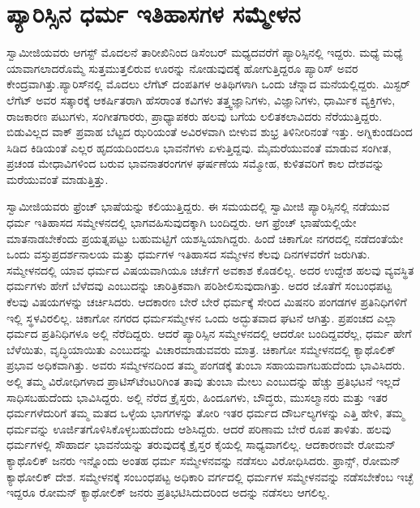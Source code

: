 
\chapter{ಪ್ಯಾರಿಸ್ಸಿನ ಧರ್ಮ ಇತಿಹಾಸಗಳ ಸಮ್ಮೇಳನ }

 ಸ್ವಾಮೀಜಿಯವರು ಆಗಸ್ಟ್ ಮೊದಲನೆ ತಾರೀಖಿನಿಂದ ಡಿಸೆಂಬರ್ ಮಧ್ಯದವರೆಗೆ ಪ್ಯಾರಿಸ್ಸಿನಲ್ಲಿ ಇದ್ದರು. ಮಧ್ಯೆ ಮಧ್ಯೆ ಯಾವಾಗಲಾದರೊಮ್ಮೆ ಸುತ್ತಮುತ್ತಲಿರುವ ಊರನ್ನು ನೋಡುವುದಕ್ಕೆ ಹೋಗುತ್ತಿದ್ದರೂ ಪ್ಯಾರಿಸ್ ಅವರ ಕೇಂದ್ರವಾಗಿತ್ತು.\break ಪ್ಯಾರಿಸ್‍ನಲ್ಲಿ ಮೊದಲು ಲೆಗೆಟ್ ದಂಪತಿಗಳ ಅತಿಥಿಗಳಾಗಿ ಒಂದು ಚೆನ್ನಾದ ಮನೆಯಲ್ಲಿದ್ದರು. ಮಿಸ್ಟರ್ ಲೆಗೆಟ್ ಅವರ ಸತ್ಕಾರಕ್ಕೆ ಆಕರ್ಷಿತರಾಗಿ ಹೆಸರಾಂತ ಕವಿಗಳು ತತ್ತ್ವಜ್ಞಾನಿಗಳು, ವಿಜ್ಞಾನಿಗಳು, ಧಾರ್ಮಿಕ ವ್ಯಕ್ತಿಗಳು, ರಾಜಕಾರಣ ಪಟುಗಳು, ಸಂಗೀತಗಾರರು, ಪ್ರಾಧ್ಯಾಪಕರು ಹಲವು ಬಗೆಯ ಲಲಿತಕಲಾವಿದರು \break ನೆರೆಯುತ್ತಿದ್ದರು. ಬಿಡುವಿಲ್ಲದ ವಾಕ್ ಪ್ರವಾಹ ಬೆಟ್ಟದ ಝರಿಯಂತೆ ಅವಿರಳವಾಗಿ ಬೀಳುವ ಶುಭ್ರ ತಿಳಿನೀರಿನಂತೆ ಇತ್ತು. ಅಗ್ನಿಕುಂಡದಿಂದ ಸಿಡಿದ ಕಿಡಿಯಂತೆ ಎಲ್ಲರ ಹೃದಯದಿಂದಲೂ ಭಾವನೆಗಳು ಏಳುತ್ತಿದ್ದವು. ಮೈಮರೆಯುವಂತೆ ಮಾಡುವ ಸಂಗೀತ, ಪ್ರಚಂಡ ಮೇಧಾವಿಗಳಿಂದ ಬರುವ ಭಾವನಾತರಂಗಗಳ ಘರ್ಷಣೆಯ ಸಮ್ಮೋಹ, ಕುಳಿತವರಿಗೆ ಕಾಲ ದೇಶವನ್ನು ಮರೆಯುವಂತೆ ಮಾಡುತ್ತಿತ್ತು. 

 ಸ್ವಾಮೀಜಿಯವರು ಫ್ರೆಂಚ್ ಭಾಷೆಯನ್ನು ಕಲಿಯುತ್ತಿದ್ದರು. ಈ ಸಮಯದಲ್ಲಿ ಸ್ವಾಮೀಜಿ ಪ್ಯಾರಿಸ್ಸಿನಲ್ಲಿ ನಡೆಯುವ ಧರ್ಮ ಇತಿಹಾಸದ ಸಮ್ಮೇಳನದಲ್ಲಿ ಭಾಗವಹಿಸುವುದಕ್ಕಾಗಿ ಬಂದಿದ್ದರು. ಆಗ ಫ್ರೆಂಚ್ ಭಾಷೆಯಲ್ಲಿಯೇ ಮಾತನಾಡಬೇಕೆಂದು ಪ್ರಯತ್ನಪಟ್ಟು ಬಹುಮಟ್ಟಿಗೆ ಯಶಸ್ವಿಯಾಗಿದ್ದರು. ಹಿಂದೆ ಚಿಕಾಗೋ ನಗರದಲ್ಲಿ ನಡೆದಂತೆಯೇ ಒಂದು ವಸ್ತುಪ್ರದರ್ಶನಾಲಯ ಮತ್ತು ಧರ್ಮಗಳ ಇತಿಹಾಸದ ಸಮ್ಮೇಳನ ಕೆಲವು ದಿನಗಳವರೆಗೆ ಜರುಗಿತು. ಸಮ್ಮೇಳನದಲ್ಲಿ ಯಾವ ಧರ್ಮದ ವಿಷಯವಾಗಿಯೂ ಚರ್ಚೆಗೆ ಅವಕಾಶ ಕೊಡಲಿಲ್ಲ. ಅದರ ಉದ್ದೇಶ ಹಲವು ವ್ಯವಸ್ಥಿತ ಧರ್ಮಗಳು ಹೇಗೆ ಬೆಳೆದವು ಎಂಬುದನ್ನು ಚಾರಿತ್ರಿಕವಾಗಿ ಪರಿಶೀಲಿಸುವುದಾಗಿತ್ತು. ಅದರ ಜೊತೆಗೆ ಸಂಬಂಧಪಟ್ಟ ಕೆಲವು ವಿಷಯಗಳನ್ನು ಚರ್ಚಿಸಿದರು. ಆದಕಾರಣ ಬೇರೆ ಬೇರೆ ಧರ್ಮಕ್ಕೆ ಸೇರಿದ ಮಿಷನರಿ ಪಂಗಡಗಳ ಪ್ರತಿನಿಧಿಗಳಿಗೆ ಇಲ್ಲಿ ಸ್ಥಳವಿರಲಿಲ್ಲ. ಚಿಕಾಗೋ ನಗರದ ಧರ್ಮಸಮ್ಮೇಳನ ಒಂದು ಅದ್ಭುತವಾದ ಘಟನೆ ಆಗಿತ್ತು. ಪ್ರಪಂಚದ ಎಲ್ಲಾ ಧರ್ಮದ ಪ್ರತಿನಿಧಿಗಳೂ ಅಲ್ಲಿ ನೆರೆದಿದ್ದರು. ಆದರೆ ಪ್ಯಾರಿಸ್ಸಿನ ಸಮ್ಮೇಳನದಲ್ಲಿ ಆದರೋ ಬಂದಿದ್ದವರೆಲ್ಲ, ಧರ್ಮ ಹೇಗೆ ಬೆಳೆಯಿತು, ವೃದ್ಧಿಯಾಯಿತು ಎಂಬುದನ್ನು ವಿಚಾರಮಾಡುವವರು ಮಾತ್ರ. ಚಿಕಾಗೋ ಸಮ್ಮೇಳನದಲ್ಲಿ ಕ್ಯಾಥೊಲಿಕ್ ಪ್ರಭಾವ ಅಧಿಕವಾಗಿತ್ತು. ಅವರು ಸಮ್ಮೇಳನದಿಂದ ತಮ್ಮ ಪಂಗಡಕ್ಕೆ ತುಂಬಾ ಸಹಾಯವಾಗಬಹುದೆಂದು ಭಾವಿಸಿದರು. ಅಲ್ಲಿ ತಮ್ಮ ವಿರೋಧಿಗಳಾದ ಪ್ರಾಟಿಸ್‍ಟೆಂಟರಿಗಿಂತ ತಾವು ತುಂಬಾ ಮೇಲು ಎಂಬುದನ್ನು ಹೆಚ್ಚು ಪ್ರತಿಭಟನೆ ಇಲ್ಲದೆ ಸಾಧಿಸಬಹುದೆಂದು ಭಾವಿಸಿದ್ದರು. ಅಲ್ಲಿ ನೆರೆದ ಕ್ರೈಸ್ತರು, ಹಿಂದೂಗಳು, ಬೌದ್ಧರು, ಮುಸಲ್ಮಾನರು ಮತ್ತು ಇತರ ಧರ್ಮಗಳೆದುರಿಗೆ ತಮ್ಮ ಮತದ ಒಳ್ಳೆಯ ಭಾಗಗಳನ್ನು ತೋರಿ ಇತರ ಧರ್ಮದ ದೌರ್ಬಲ್ಯಗಳನ್ನು ಎತ್ತಿ ಹೇಳಿ, ತಮ್ಮ ಧರ್ಮವನ್ನು ಊರ್ಜಿತಗೊಳಿಸಿಕೊಳ್ಳಬಹುದೆಂದು ಆಶಿಸಿದ್ದರು. ಆದರೆ ಪರಿಣಾಮ ಬೇರೆ ರೂಪ ತಾಳಿತು. ಹಲವು ಧರ್ಮಗಳಲ್ಲಿ ಸೌಹಾರ್ದ ಭಾವನೆಯನ್ನು ತರುವುದಕ್ಕೆ ಕ್ರೈಸ್ತರ ಕೈಯಲ್ಲಿ ಸಾಧ್ಯವಾಗಲಿಲ್ಲ. ಆದಕಾರಣವೇ ರೋಮನ್ ಕ್ಯಾಥೊಲಿಕ್ ಜನರು ಇನ್ನೊಂದು ಅಂತಹ ಧರ್ಮ ಸಮ್ಮೇಳನವನ್ನು ನಡೆಸಲು ವಿರೋಧಿಸಿದರು. ಫ್ರಾನ್ಸ್, ರೋಮನ್ ಕ್ಯಾಥೋಲಿಕ್ ದೇಶ. ಸಮ್ಮೇಳನಕ್ಕೆ ಸಂಬಂಧಪಟ್ಟ ಅಧಿಕಾರಿ ವರ್ಗದಲ್ಲಿ ಧರ್ಮಗಳ ಸಮ್ಮೇಳನವನ್ನು ನಡೆಸಬೇಕೆಂಬ ಇಚ್ಛೆ ಇದ್ದರೂ ರೋಮನ್ ಕ್ಯಾಥೋಲಿಕ್ ಜನರು ಪ್ರತಿಭಟಿಸಿದುದರಿಂದ ಅದನ್ನು ನಡೆಸಲು ಆಗಲಿಲ್ಲ. 

